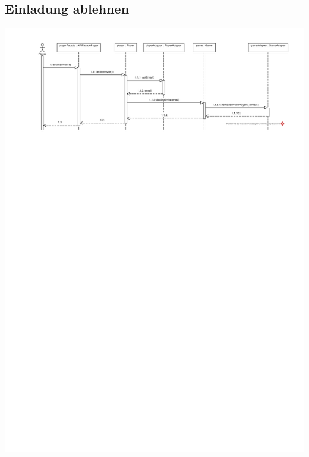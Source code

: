 \documentclass[a4paper]{scrreprt}
\begin{document}
	\subsection{Einladung ablehnen}
	\includegraphics[width=\textwidth]{img/Einladung_ablehnen.pdf}
\end{document}
